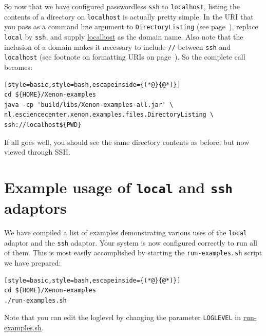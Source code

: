 \documentclass[12pt, a4paper, twoside, openany, titlepage]{book}
\begin{document}
So now that we have configured passwordless \texttt{ssh} to \texttt{localhost}, listing the contents of a directory on \texttt{localhost} is actually pretty simple. In the URI that you pass as a command line argument to \texttt{DirectoryListing} (see page~\pageref{snip:directory-listing-local}), replace \texttt{local} by \texttt{ssh}, and supply \url{localhost} as the domain name. Also note that the inclusion of a domain makes it necessary to include \texttt{//} between \texttt{ssh} and \texttt{localhost} (see footnote on formatting URIs on page~\pageref{footnote:format-uri}). So the complete call becomes:

\begin{lstlisting}[style=basic,style=bash,escapeinside={(*@}{@*)}]
cd ${HOME}/Xenon-examples
java -cp 'build/libs/Xenon-examples-all.jar' \
nl.esciencecenter.xenon.examples.files.DirectoryListing \
ssh://localhost${PWD}
\end{lstlisting} %

If all goes well, you should see the same directory contents as before, but now viewed through SSH.

\section{Example usage of \texttt{local} and \texttt{ssh} adaptors}

\Needspace{6\baselineskip}
We have compiled a list of examples demonstrating various uses of the \texttt{local} adaptor and the \texttt{ssh} adaptor. Your system is now configured correctly to run all of them. This is most easily accomplished by starting the \texttt{run-examples.sh} script we have prepared:
\begin{lstlisting}[style=basic,style=bash,escapeinside={(*@}{@*)}]
cd ${HOME}/Xenon-examples
./run-examples.sh
\end{lstlisting} %

Note that you can edit the loglevel by changing the parameter \texttt{LOGLEVEL} in \url{run-examples.sh}.













\end{document}
